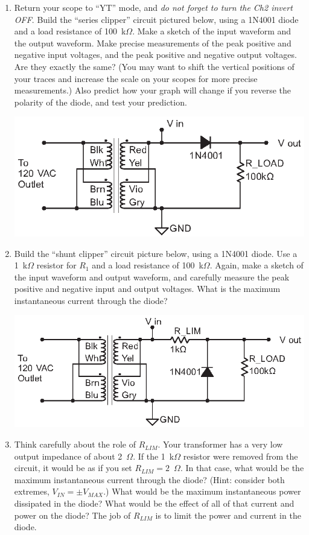 \begin{enumerate}[wide]
\item Return your scope to ``YT'' mode, and \textit{do not forget to turn the Ch2 invert OFF}.  Build the ``series clipper'' circuit pictured below, using a 1N4001 diode and a load resistance of 100~k$\Omega$.  Make a sketch of the input waveform and the output waveform.  Make precise measurements of the peak positive and negative input voltages, and the peak positive and negative output voltages.  Are they exactly the same?  (You may want to shift the vertical positions of your traces and increase the scale on your scopes for more precise measurements.)  Also predict how your graph will change if you reverse the polarity of the diode, and test your prediction.
\begin{center}
\includegraphics{diodes/series_clipper.eps}
\end{center}

\item Build the ``shunt clipper'' circuit picture below, using a 1N4001 diode.  Use a 1~k$\Omega$ resistor for $R_1$ and a load resistance of 100~k$\Omega$.  Again, make a sketch of the input waveform and output waveform, and carefully measure the peak positive and negative input and output voltages.  What is the maximum instantaneous current through the diode?  \label{part_shunt_clipper}
\begin{center}
\includegraphics{diodes/shunt_clipper.eps}
\end{center} 
\item Think carefully about the role of $R_{LIM}$.  Your transformer has a very low output impedance of about 2~$\Omega$.  If the 1~k$\Omega$ resistor were removed from the circuit, it would be as if you set $R_{LIM} = 2$~$\Omega$.  In that case, what would be the maximum instantaneous current through the diode?  (Hint: consider both extremes, $V_{IN} = \pm V_{MAX}$.) What would be the maximum instantaneous power dissipated in the diode?  What would be the effect of all of that current and power on the diode?  The job of $R_{LIM}$ is to limit the power and current in the diode.


\end{enumerate}

